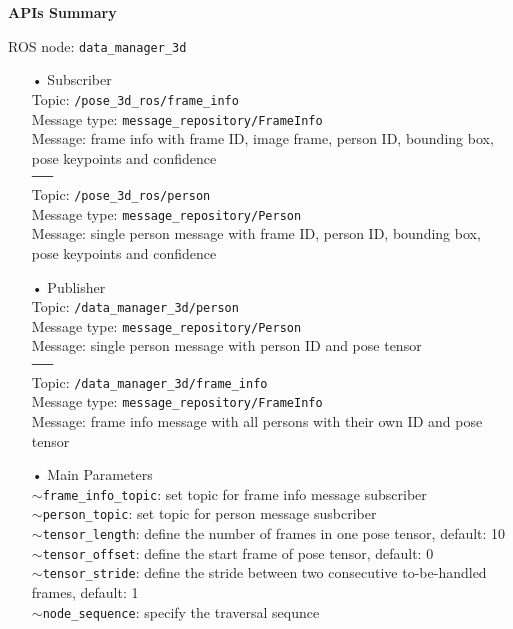 \begin{table}[h!]
\label{tab:pose_pool}
\end{table}


\textbf{APIs Summary}

ROS node: \texttt{data\_manager\_3d}

\begin{itemize}

\item[•] Subscriber \\
Topic: \texttt{/pose\_3d\_ros/frame\_info} \\
Message type: \texttt{message\_repository/FrameInfo} \\
Message: frame info with frame ID, image frame, person ID, bounding box, pose keypoints and confidence \\
\texttt{--------} \\
Topic: \texttt{/pose\_3d\_ros/person} \\
Message type: \texttt{message\_repository/Person} \\
Message: single person message with frame ID, person ID, bounding box, pose keypoints and confidence

\item[•] Publisher \\
Topic: \texttt{/data\_manager\_3d/person} \\ 
Message type: \texttt{message\_repository/Person} \\
Message: single person message with person ID and pose tensor \\
\texttt{--------} \\
Topic: \texttt{/data\_manager\_3d/frame\_info} \\
Message type:  \texttt{message\_repository/FrameInfo} \\
Message: frame info message with all persons with their own ID and pose tensor  

\item[•] Main Parameters \\
\texttt{$\sim$frame\_info\_topic}: set topic for frame info message subscriber \\
\texttt{$\sim$person\_topic}: set topic for person message susbcriber \\
\texttt{$\sim$tensor\_length}: define the number of frames in one pose tensor, default: 10 \\
\texttt{$\sim$tensor\_offset}: define the start frame of pose tensor, default: 0 \\
\texttt{$\sim$tensor\_stride}: define the stride between two consecutive to-be-handled frames, default: 1 \\
\texttt{$\sim$node\_sequence}: specify the traversal sequnce
\end{itemize}

